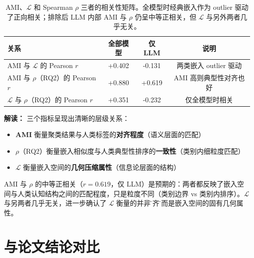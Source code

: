 \documentclass[11pt,a4paper]{article}
\begin{document}
\begin{table}[H]\centering
\begin{tabular}{lccc}
\toprule
\textbf{关系} & \textbf{全部模型} & \textbf{仅 LLM} & \textbf{说明}\\
\midrule
AMI 与 $\mathcal{L}$ 的 Pearson $r$ & +0.402 & -0.131 & 两类嵌入 outlier 驱动\\
AMI 与 $\rho$（RQ2）的 Pearson $r$ & +0.880 & +0.619 & AMI 高则典型性对齐也好\\
$\mathcal{L}$ 与 $\rho$（RQ2）的 Pearson $r$ & +0.351 & -0.232 & 仅全模型时相关\\
\bottomrule
\end{tabular}
\caption{AMI、$\mathcal{L}$ 和 Spearman $\rho$ 三者的相关性矩阵。全模型时经典嵌入作为 outlier 驱动了正向相关；排除后 LLM 内部 AMI 与 $\rho$ 仍呈中等正相关，但 $\mathcal{L}$ 与另外两者几乎无关。}
\label{tab:cross}
\end{table}

\textbf{解读：} 三个指标呈现出清晰的层级关系：
\begin{itemize}[noitemsep]
  \item \textbf{AMI} 衡量聚类结果与人类标签的\textbf{对齐程度}（语义层面的匹配）
  \item \textbf{$\rho$}（RQ2）衡量嵌入相似度与人类典型性排序的\textbf{一致性}（类别内细粒度匹配）
  \item \textbf{$\mathcal{L}$} 衡量嵌入空间的\textbf{几何压缩属性}（信息论层面的结构）
\end{itemize}
AMI 与 $\rho$ 的中等正相关（$r=0.619$，仅 LLM）是预期的：两者都反映了嵌入空间与人类认知结构之间的匹配程度，只是粒度不同（类别边界 vs 类别内排序）。$\mathcal{L}$ 与另两者几乎无关，进一步确认了 $\mathcal{L}$ 衡量的并非\"对齐\"，而是嵌入空间的固有几何属性。

\section{与论文结论对比}
\end{document}
